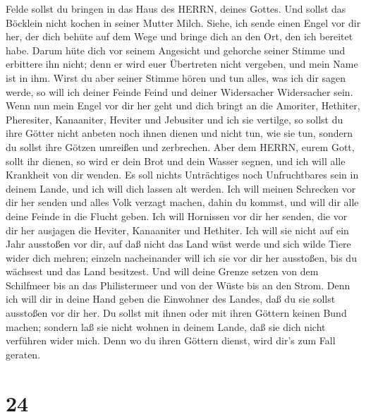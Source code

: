 Felde sollst du bringen in das Haus des HERRN, deines Gottes. Und sollst
das Böcklein nicht kochen in seiner Mutter Milch.  Siehe,
ich sende einen Engel vor dir her, der dich behüte auf dem Wege und
bringe dich an den Ort, den ich bereitet habe.  Darum hüte
dich vor seinem Angesicht und gehorche seiner Stimme und erbittere ihn
nicht; denn er wird euer Übertreten nicht vergeben, und mein Name ist in
ihm.  Wirst du aber seiner Stimme hören und tun alles, was
ich dir sagen werde, so will ich deiner Feinde Feind und deiner
Widersacher Widersacher sein.  Wenn nun mein Engel vor dir
her geht und dich bringt an die Amoriter, Hethiter, Pheresiter,
Kanaaniter, Heviter und Jebusiter und ich sie vertilge,  so
sollst du ihre Götter nicht anbeten noch ihnen dienen und nicht tun, wie
sie tun, sondern du sollst ihre Götzen umreißen und zerbrechen.
 Aber dem HERRN, eurem Gott, sollt ihr dienen, so wird er
dein Brot und dein Wasser segnen, und ich will alle Krankheit von dir
wenden.  Es soll nichts Unträchtiges noch Unfruchtbares
sein in deinem Lande, und ich will dich lassen alt werden. 
Ich will meinen Schrecken vor dir her senden und alles Volk verzagt
machen, dahin du kommst, und will dir alle deine Feinde in die Flucht
geben.  Ich will Hornissen vor dir her senden, die vor dir
her ausjagen die Heviter, Kanaaniter und Hethiter.  Ich
will sie nicht auf ein Jahr ausstoßen vor dir, auf daß nicht das Land
wüst werde und sich wilde Tiere wider dich mehren;  einzeln
nacheinander will ich sie vor dir her ausstoßen, bis du wächsest und das
Land besitzest.  Und will deine Grenze setzen von dem
Schilfmeer bis an das Philistermeer und von der Wüste bis an den Strom.
Denn ich will dir in deine Hand geben die Einwohner des Landes, daß du
sie sollst ausstoßen vor dir her.  Du sollst mit ihnen oder
mit ihren Göttern keinen Bund machen;  sondern laß sie
nicht wohnen in deinem Lande, daß sie dich nicht verführen wider mich.
Denn wo du ihren Göttern dienst, wird dir's zum Fall geraten.

\hypertarget{section-23}{%
\section{24}\label{section-23}}

